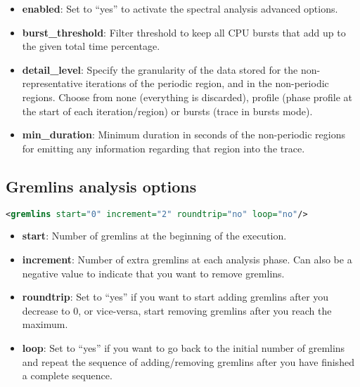 \begin{itemize}
 \item \textbf{enabled}: Set to ``yes'' to activate the spectral analysis advanced options.
 \item \textbf{burst\_threshold}: Filter threshold to keep all CPU bursts that add up to the given total time percentage.
 \item \textbf{detail\_level}: Specify the granularity of the data stored for the non-representative iterations of the 
 periodic region, and in the non-periodic regions. Choose from none (everything is discarded), 
 profile (phase profile at the start of each iteration/region) or bursts (trace in bursts mode).
 \item \textbf{min\_duration}: Minimum duration in seconds of the non-periodic regions for emitting any information 
 regarding that region into the trace. 
\end{itemize}
           
\subsection{Gremlins analysis options}

\begin{lstlisting}[language=XML,frame=single]
<gremlins start="0" increment="2" roundtrip="no" loop="no"/>
\end{lstlisting}

\begin{itemize} 
 \item \textbf{start}: Number of gremlins at the beginning of the execution.
 \item \textbf{increment}: Number of extra gremlins at each analysis phase. Can also be a negative value to indicate that
 you want to remove gremlins.
 \item \textbf{roundtrip}: Set to ``yes'' if you want to start adding gremlins after 
 you decrease to 0, or vice-versa, start removing gremlins after you reach the maximum.
 \item \textbf{loop}: Set to ``yes'' if you want to go back to the initial number 
 of gremlins and repeat the sequence of adding/removing gremlins after you have finished a complete sequence.
\end{itemize}
        



